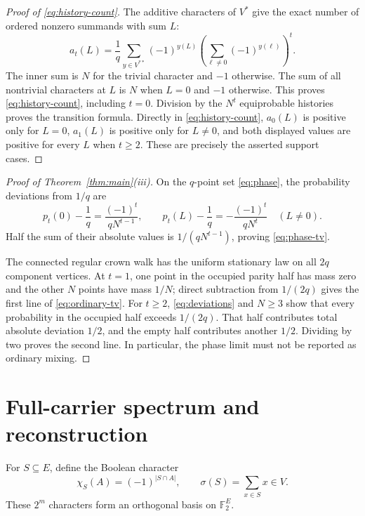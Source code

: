 \documentclass[a4paper,10pt]{amsart}
\theoremstyle{remark}
\newcommand{\F}{\mathbb F}
\begin{document}
\begin{proof}[Proof of \eqref{eq:history-count}]
The additive characters of $V^*$ give the exact number of ordered nonzero
summands with sum $L$:
\begin{equation}\label{eq:fourier-count}
 a_t(L)=\frac1q\sum_{y\in V^{**}}(-1)^{y(L)}
       \left(\sum_{\ell\ne0}(-1)^{y(\ell)}\right)^t.
\end{equation}
The inner sum is $N$ for the trivial character and $-1$ otherwise.  The sum
of all nontrivial characters at $L$ is $N$ when $L=0$ and $-1$ otherwise.
This proves \eqref{eq:history-count}, including $t=0$.  Division by the
$N^t$ equiprobable histories proves the transition formula.  Directly in
\eqref{eq:history-count}, $a_0(L)$ is positive only for $L=0$,
$a_1(L)$ is positive only for $L\ne0$, and both displayed values are positive
for every $L$ when $t\ge2$.  These are precisely the asserted support cases.
\end{proof}

\begin{proof}[Proof of Theorem~\ref{thm:main}(iii)]
On the $q$-point set \eqref{eq:phase}, the probability deviations from
$1/q$ are
\begin{equation}\label{eq:deviations}
 p_t(0)-\frac1q=\frac{(-1)^t}{qN^{t-1}},\qquad
 p_t(L)-\frac1q=-\frac{(-1)^t}{qN^t}\quad(L\ne0).
\end{equation}
Half the sum of their absolute values is $1/(qN^{t-1})$, proving
\eqref{eq:phase-tv}.

The connected regular crown walk has the uniform stationary law on all
$2q$ component vertices.  At $t=1$, one point in the occupied parity half
has mass zero and the other $N$ points have mass $1/N$; direct subtraction
from $1/(2q)$ gives the first line of \eqref{eq:ordinary-tv}.  For $t\ge2$,
\eqref{eq:deviations} and $N\ge3$ show that every probability in the
occupied half exceeds $1/(2q)$.  That half contributes total absolute
deviation $1/2$, and the empty half contributes another $1/2$.  Dividing by
two proves the second line.  In particular, the phase limit must not be
reported as ordinary mixing.
\end{proof}

\section{Full-carrier spectrum and reconstruction}

For $S\subseteq E$, define the Boolean character
\begin{equation}\label{eq:boolean-character}
 \chi_S(A)=(-1)^{|S\cap A|},\qquad
 \sigma(S)=\sum_{x\in S}x\in V.
\end{equation}
These $2^m$ characters form an orthogonal basis on $\F_2^E$.
\end{document}

